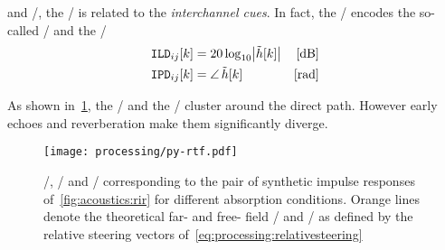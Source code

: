  and \CASA/, the \RTF/ is related to the \textit{interchannel cues}.
In fact, the \RTFs/ encodes the so-called \ILD/ and the \IPD/
\begin{equation}
    \begin{aligned}
        \ild_{ij}[k] &= 20 \log_{10} \magnitudeOf{\rtf[k]} & [\si{\dB}]\\
        \ipd_{ij}[k] &= \phaseOf{\rtf[k]} \mathspace       & [\si{\radian}]
    \end{aligned}
\end{equation}

As shown in~\cref{fig:processing:ildipd}, the \ILD/ and the \IPD/ cluster around the direct path.
However early echoes and reverberation make them significantly diverge.

\begin{figure}[b]
    \begin{fullwidthfig}
        \texttt{[image: processing/py-rtf.pdf]}
        \caption{
            \RIR/, \ILD/ and \IPD/ corresponding to the pair of synthetic impulse responses of~\cref{fig:acoustics:rir} for different absorption conditions.
            Orange lines denote the theoretical far- and free- field \ILD/ and \IPD/ as defined by the relative steering vectors of~\cref{eq:processing:relativesteering}
        }\label{fig:processing:ildipd}
    \end{fullwidthfig}

\end{figure}


